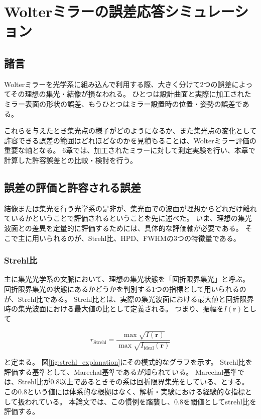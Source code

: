 \documentclass[dvipdfmx,autodetect-engine]{jreport}
\begin{document}
\newpage
\chapter{Wolterミラーの誤差応答シミュレーション}
\minitoc

\newpage
\section{諸言}
Wolterミラーを光学系に組み込んで利用する際、大きく分けて2つの誤差によってその理想の集光・結像が損なわれる。
ひとつは設計曲面と実際に加工されたミラー表面の形状の誤差、もうひとつはミラー設置時の位置・姿勢の誤差である。

これらを与えたとき集光点の様子がどのようになるか、また集光点の変化として許容できる誤差の範囲はどれほどなのかを見積もることは、Wolterミラー評価の重要な軸となる。
6章では、加工されたミラーに対して測定実験を行い、本章で計算した許容誤差との比較・検討を行う。

\section{誤差の評価と許容される誤差}
結像または集光を行う光学系の是非が、集光面での波面が理想からどれだけ離れているかということで評価されるということを先に述べた。
いま、理想の集光波面との差異を定量的に評価するためには、具体的な評価軸が必要である。
そこで主に用いられるのが、Strehl比、HPD、FWHMの3つの特徴量である。

\subsection{Strehl比}
主に集光光学系の文脈において、理想の集光状態を「回折限界集光」と呼ぶ。
回折限界集光の状態にあるかどうかを判別する1つの指標として用いられるのが、Strehl比である。
Strehl比とは、実際の集光波面における最大値と回折限界時の集光波面における最大値の比として定義される。
つまり、振幅を$I(\mathbf{r})$として

\[
r_{\mathrm{Strehl}} = \frac{ \max{\sqrt{I(\mathbf{r})} } }{ \max{ \sqrt{I_{\mathrm{ideal}}( \mathbf{r} )} } }
\]

と定まる。
図\ref{fig:strehl_explanation}にその模式的なグラフを示す。
Strehl比を評価する基準として、Marechal基準である\citep{bornwolf:1999:book}が知られている。
Marechal基準では、Strehl比が0.8以上であるときその系は回折限界集光をしている、とする。
この0.8という値には体系的な根拠はなく、解析・実験における経験的な指標として扱われている。
本論文では、この慣例を踏襲し、0.8を閾値としてstrehl比を評価する。
\end{document}
